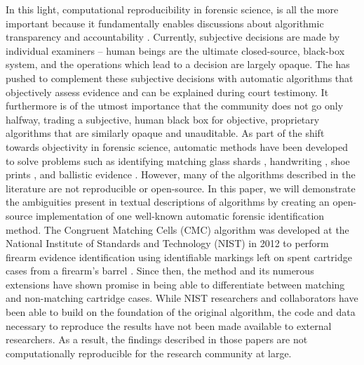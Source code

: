In this light, computational reproducibility in forensic science, is all
the more important because it fundamentally enables discussions about
algorithmic transparency and accountability
\citep{kwongAlgorithmSaysYou2017, desaiTrustVerifyGuide2017}. Currently,
subjective decisions are made by individual examiners -- human beings
are the ultimate closed-source, black-box system, and the operations
which lead to a decision are largely opaque. The
\citet{council_strengthening_2009} has pushed to complement these
subjective decisions with automatic algorithms that objectively assess
evidence and can be explained during court testimony. It furthermore is
of the utmost importance that the community does not go only halfway,
trading a subjective, human black box for objective, proprietary
algorithms that are similarly opaque and unauditable. As part of the
shift towards objectivity in forensic science, automatic methods have
been developed to solve problems such as identifying matching glass
shards \citep{park2019}, handwriting \citep{crawford_handwriting_2020},
shoe prints \citep{park_algorithm_2020}, and ballistic evidence
\citep{hare_automatic_2016,tai_fully_2018}. However, many of the
algorithms described in the literature are not reproducible or
open-source. In this paper, we will demonstrate the ambiguities present
in textual descriptions of algorithms by creating an open-source
implementation of one well-known automatic forensic identification
method. The Congruent Matching Cells (CMC) algorithm was developed at
the National Institute of Standards and Technology (NIST) in 2012 to
perform firearm evidence identification using identifiable markings left
on spent cartridge cases from a firearm's barrel
\citep{song_proposed_2013}. Since then, the method and its numerous
extensions
\citep{tong_improved_2015,chen_convergence_2017,song_estimating_2018}
have shown promise in being able to differentiate between matching and
non-matching cartridge cases. While NIST researchers and collaborators
have been able to build on the foundation of the original algorithm, the
code and data necessary to reproduce the results have not been made
available to external researchers. As a result, the findings described
in those papers are not computationally reproducible for the research
community at large.

